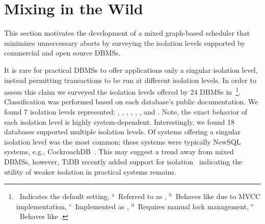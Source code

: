 \section{Mixing in the Wild}
\label{sec:mixing-wild}

This section motivates the development of a mixed graph-based scheduler that minimizes unneccessary aborts
by surveying the isolation levels supported by commercial and open source DBMSs.

It is rare for practical DBMSs to offer applications only a singular isolation level, instead permitting
transactions to be run at different isolation levels. In order to assess this claim we surveyed the 
isolation levels offered by 24 DBMSs in~\footnote{
\df~Indicates the default setting,
$^{\mathrm{a}}$~Referred to as ,
$^{\mathrm{b}}$~Behaves like  due to MVCC implementation,
$^{\mathrm{c}}$~Implemented as ,
$^{\mathrm{d}}$~Requires manual lock management,
$^{\mathrm{e}}$~Behaves like .}. Classification was performed 
based on each database's public documentation. We found 7 isolation levels represented:
, , , , 
, , and . Note, the exact behavior of each 
isolation level is highly system-dependent. Interestingly, we found 18 databases supported multiple isolation
levels. Of systems offering a singular isolation level  was the most common; these systems 
were typically NewSQL~\cite{DBLP:journals/sigmod/PavloA16} systems, e.g., 
CockroachDB~\cite{DBLP:conf/sigmod/TaftSMVLGNWBPBR20}. This may suggest a trend away 
from mixed DBMSs, however, TiDB recently added support for  isolation~\cite{tidb} 
indicating the utility of weaker isolation in practical systems remains.

